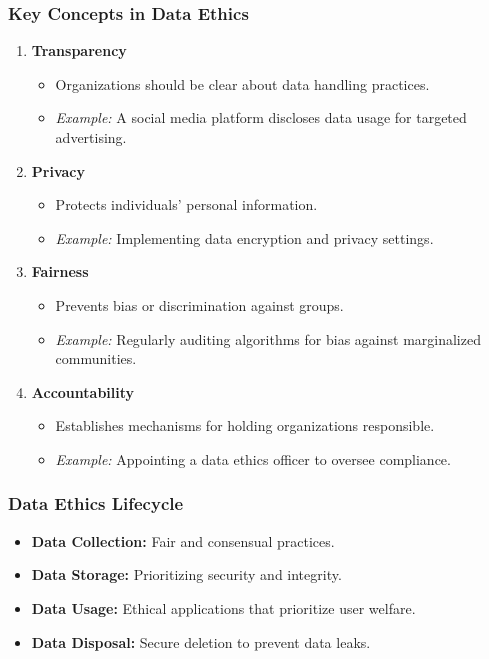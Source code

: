 \documentclass[aspectratio=169]{beamer}
\begin{document}
\begin{frame}[fragile]
    \frametitle{Key Concepts in Data Ethics}
    \begin{enumerate}
        \item \textbf{Transparency}
        \begin{itemize}
            \item Organizations should be clear about data handling practices.
            \item \textit{Example:} A social media platform discloses data usage for targeted advertising.
        \end{itemize}
        
        \item \textbf{Privacy}
        \begin{itemize}
            \item Protects individuals’ personal information.
            \item \textit{Example:} Implementing data encryption and privacy settings.
        \end{itemize}

        \item \textbf{Fairness}
        \begin{itemize}
            \item Prevents bias or discrimination against groups.
            \item \textit{Example:} Regularly auditing algorithms for bias against marginalized communities.
        \end{itemize}

        \item \textbf{Accountability}
        \begin{itemize}
            \item Establishes mechanisms for holding organizations responsible.
            \item \textit{Example:} Appointing a data ethics officer to oversee compliance.
        \end{itemize}
    \end{enumerate}
\end{frame}

\begin{frame}[fragile]
    \frametitle{Data Ethics Lifecycle}
    \begin{itemize}
        \item \textbf{Data Collection:} Fair and consensual practices.
        \item \textbf{Data Storage:} Prioritizing security and integrity.
        \item \textbf{Data Usage:} Ethical applications that prioritize user welfare.
        \item \textbf{Data Disposal:} Secure deletion to prevent data leaks.
    \end{itemize}
\end{frame}
\end{document}
